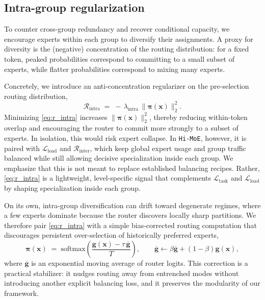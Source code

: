 \documentclass[sigconf,nonacm]{acmart}
\begin{document}
\subsection{Intra-group regularization}
To counter cross-group redundancy and recover conditional capacity, we encourage experts within each group to diversify their assignments.
A proxy for diversity is the (negative) concentration of the routing distribution: for a fixed token, peaked probabilities correspond to committing to a small subset of experts, while flatter probabilities correspond to mixing many experts.

Concretely, we introduce an anti-concentration regularizer on the pre-selection routing distribution,
\begin{equation}
\mathcal{R}_{\text{intra}}
\;=\;
-\,\lambda_{\text{intra}} \,\bigl\|\bm{\pi}(\mathbf{x})\bigr\|_2^2 .
\label{eq:r_intra}
\end{equation}
Minimizing \eqref{eq:r_intra} increases $\|\bm{\pi}(\mathbf{x})\|_2^2$, thereby reducing within-token overlap and encouraging the router to commit more strongly to a subset of experts.
In isolation, this would risk expert collapse.
In \texttt{Hi-MoE}, however, it is paired with $\mathcal{L}_{\text{load}}$ and $\mathcal{R}_{\text{inter}}$, which keep global expert usage and group traffic balanced while still allowing decisive specialization inside each group.
We emphasize that this is not meant to replace established balancing recipes.
Rather, \eqref{eq:r_intra} is a lightweight, level-specific signal that complements $\mathcal{L}_{\text{task}}$ and $\mathcal{L}_{\text{load}}$ by shaping specialization inside each group.

On its own, intra-group diversification can drift toward degenerate regimes, where a few experts dominate because the router discovers locally sharp partitions.
We therefore pair \eqref{eq:r_intra} with a simple bias-corrected routing computation that discourages persistent over-selection of historically preferred experts,
\begin{equation*}
\bm{\pi}(\mathbf{x})
\;=\;
\mathrm{softmax}\!\left(\frac{\mathbf{g}(\mathbf{x}) - \tau \,\overline{\mathbf{g}}}{T}\right),
\qquad
\overline{\mathbf{g}} \leftarrow \beta \overline{\mathbf{g}} + (1-\beta)\mathbf{g}(\mathbf{x}),
\end{equation*}
where $\overline{\mathbf{g}}$ is an exponential moving average of router logits.
This correction is a practical stabilizer: it nudges routing away from entrenched modes without introducing another explicit balancing loss, and it preserves the modularity of our framework.
\end{document}
